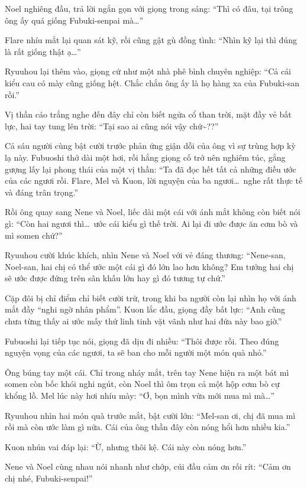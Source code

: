 \documentclass[../main.tex]{subfiles}
\begin{document}
Noel nghiêng đầu, trả lời ngắn gọn với giọng trong sáng: ``Thì có đâu, tại trông ông ấy quá giống Fubuki-senpai mà\dots''

Flare nhíu mắt lại quan sát kỹ, rồi cũng gật gù đồng tình: ``Nhìn kỹ lại thì đúng là rất giống thật ạ\dots''

Ryuuhou lại thêm vào, giọng cứ như một nhà phê bình chuyên nghiệp: ``Cả cái kiểu cau có mày cũng giống hệt. Chắc chắn ông ấy là họ hàng xa của Fubuki-san rồi.''

Vị thần cáo trắng nghe đến đây chỉ còn biết ngửa cổ than trời, mặt đầy vẻ bất lực, hai tay tung lên trời: ``Tại sao ai cũng nói vậy chứ\~{}??''

Cả sáu người cùng bật cười trước phản ứng giận dỗi của ông vì sự trùng hợp kỳ lạ này. Fubuoshi thở dài một hơi, rồi hắng giọng cố trở nên nghiêm túc, gắng gượng lấy lại phong thái của một vị thần: ``Ta đã đọc hết tất cả những điều ước của các ngươi rồi. Flare, Mel và Kuon, lời nguyện của ba ngươi\dots\ nghe rất thực tế và đáng trân trọng.''

Rồi ông quay sang Nene và Noel, liếc dài một cái với ánh mắt không còn biết nói gì: ``Còn hai ngươi thì\dots\ ước cái kiểu gì thế trời. Ai lại đi ước được ăn cơm bò và mì somen chứ?''

Ryuuhou cười khúc khích, nhìn Nene và Noel với vẻ đáng thương: ``Nene-san, Noel-san, hai chị có thể ước một cái gì đó lớn lao hơn không? Em tưởng hai chị sẽ ước được đứng trên sân khấu lớn hay gì đó tương tự chứ.''

Cặp đôi bị chỉ điểm chỉ biết cười trừ, trong khi ba người còn lại nhìn họ với ánh mắt đầy ``nghi ngờ nhân phẩm''. Kuon lắc đầu, giọng đầy bất lực: ``Anh cũng chưa từng thấy ai ước mấy thứ linh tinh vặt vãnh như hai đứa này bao giờ.''

Fubuoshi lại tiếp tục nói, giọng đã dịu đi nhiều: ``Thôi được rồi. Theo đúng nguyện vọng của các ngươi, ta sẽ ban cho mỗi người một món quà nhỏ.''

Ông búng tay một cái. Chỉ trong nháy mắt, trên tay Nene hiện ra một bát mì somen còn bốc khói nghi ngút, còn Noel thì ôm trọn cả một hộp cơm bò cự khổng lồ. Mel lúc này hơi nhíu mày: ``Ơ, bọn mình vừa mới mua mì mà\dots''

Ryuuhou nhìn hai món quà trước mắt, bật cười lớn: ``Mel-san ơi, chị đã mua mì rồi mà còn ước làm gì nữa. Cái của ông thần đây còn nóng hổi hơn nhiều kia.''

Kuon nhún vai đáp lại: ``Ừ, nhưng thôi kệ. Cái này còn nóng hơn.''

Nene và Noel cùng nhau nói nhanh như chớp, cúi đầu cảm ơn rối rít: ``Cảm ơn chị nhé, Fubuki-senpai!''
\end{document}

